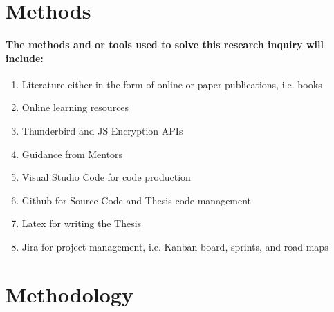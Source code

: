 \documentclass[12pt,a4paper]{article}
\begin{document}
\section{Methods}
%
%



\paragraph{The methods and or tools used to solve this research inquiry will include:}

\begin{enumerate}
\item Literature either in the form of online or paper publications, i.e. books
\item Online learning resources
\item Thunderbird and JS Encryption APIs
\item Guidance from Mentors
\item Visual Studio Code for code production
\item Github for Source Code and Thesis code management
\item Latex for writing the Thesis
\item Jira for project management, i.e. Kanban board, sprints, and road maps
\end{enumerate}



\section{Methodology} %
\end{document}
